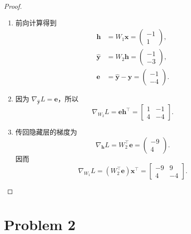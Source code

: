 \begin{proof}
    \begin{enumerate}
        \item 前向计算得到
        \[
        \begin{aligned}
            \bm{h}
            &=W_1\bm{x}
             =\boxed{\begin{pmatrix}-1\\1\end{pmatrix}},\\
            \hat{\bm{y}}
            &=W_2\bm{h}
             =\boxed{\begin{pmatrix}-1\\-3\end{pmatrix}},\\
            \bm{e}
            &=\hat{\bm{y}}-\bm{y}
             =\boxed{\begin{pmatrix}-1\\-4\end{pmatrix}}.
        \end{aligned}
        \]
        \item 因为 $\nabla_{\hat{\bm{y}}}L=\bm{e}$，所以
        \[
            \nabla_{W_2}L
            =\bm{e}\bm{h}^\top
            =\boxed{\begin{bmatrix}1&-1\\4&-4\end{bmatrix}}.
        \]
        \item 传回隐藏层的梯度为
        \[
            \nabla_{\bm{h}}L
            =W_2^\top\bm{e}
            =\begin{pmatrix}-9\\4\end{pmatrix}.
        \]
        因而
        \[
            \nabla_{W_1}L
            =(W_2^\top\bm{e})\bm{x}^\top
            =\boxed{\begin{bmatrix}-9&9\\4&-4\end{bmatrix}}.
        \]
    \end{enumerate}
\end{proof}

\section*{Problem 2}

